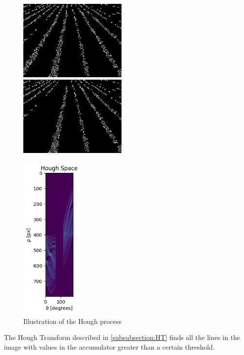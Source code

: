 \begin{figure}[h!]
\begin{minipage}{0.48\columnwidth}
\includegraphics[width=\columnwidth,height=4cm]{Report/images/beforelineremoval.png.png}
\\[3mm]
\includegraphics[width=\columnwidth,height=4cm]{Report/images/afterlineremoval.png}
\end{minipage}
\hspace{0.15\columnwidth}
\begin{minipage}{0.3\columnwidth}
\includegraphics[width=\columnwidth,height=83mm]{Report/images/ImageProcesses/HoughSpacePerso/HTwithlabelconstraint.png}

\end{minipage}
\caption{Illustration of the Hough process}
\label{pics:diffHT}

\end{figure}


The Hough Transform described in \ref{subsubsection:HT} finds all the lines in the image with values in the accumulator greater than a certain threshold.

